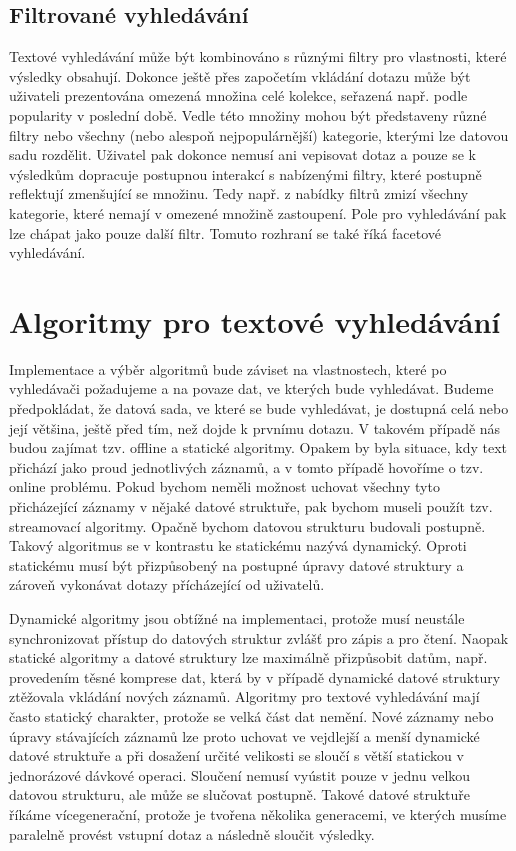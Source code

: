 \documentclass[11pt,letterpaper,oneside,openright]{book}
\begin{document}
\subsection{Filtrované vyhledávání} \label{sec:faceted_search}
Textové vyhledávání může být kombinováno s různými filtry pro vlastnosti, které
výsledky obsahují. Dokonce ještě přes započetím vkládání dotazu může být
uživateli prezentována omezená množina celé kolekce, seřazená např. podle
popularity v poslední době. Vedle této množiny mohou být představeny různé
filtry nebo všechny (nebo alespoň nejpopulárnější) kategorie, kterými lze
datovou sadu rozdělit. Uživatel pak dokonce nemusí ani vepisovat dotaz a pouze
se k výsledkům dopracuje postupnou interakcí s nabízenými filtry, které
postupně reflektují zmenšující se množinu. Tedy např. z nabídky filtrů zmizí
všechny kategorie, které nemají v omezené množině zastoupení. Pole pro
vyhledávání pak lze chápat jako pouze další filtr. Tomuto rozhraní se také říká
facetové vyhledávání.


\section{Algoritmy pro textové vyhledávání}
Implementace a výběr algoritmů bude záviset na vlastnostech, které po
vyhledávači požadujeme a na povaze dat, ve kterých bude vyhledávat. Budeme
předpokládat, že datová sada, ve které se bude vyhledávat, je dostupná celá
nebo její většina, ještě před tím, než dojde k prvnímu dotazu. V takovém
případě nás budou zajímat tzv. offline a statické algoritmy.  Opakem by byla
situace, kdy text přichází jako proud jednotlivých záznamů, a v tomto případě
hovoříme o tzv. online problému. Pokud bychom neměli možnost uchovat všechny
tyto přicházející záznamy v nějaké datové struktuře, pak bychom museli použít
tzv. streamovací algoritmy. Opačně bychom datovou strukturu budovali postupně.
Takový algoritmus se v kontrastu ke statickému nazývá dynamický. Oproti
statickému musí být přizpůsobený na postupné úpravy datové struktury a zároveň
vykonávat dotazy přícházející od uživatelů.

Dynamické algoritmy jsou obtížné na implementaci, protože musí neustále
synchronizovat přístup do datových struktur zvlášť pro zápis a pro čtení.
Naopak statické algoritmy a datové struktury lze maximálně přizpůsobit datům,
např. provedením těsné komprese dat, která by v případě dynamické datové
struktury ztěžovala vkládání nových záznamů. Algoritmy pro textové vyhledávání
mají často statický charakter, protože se velká část dat nemění. Nové záznamy
nebo úpravy stávajících záznamů lze proto uchovat ve vejdlejší a menší
dynamické datové struktuře a při dosažení určité velikosti se sloučí s větší
statickou v jednorázové dávkové operaci. Sloučení nemusí vyústit pouze v jednu
velkou datovou strukturu, ale může se slučovat postupně. Takové datové
struktuře říkáme vícegenerační, protože je tvořena několika generacemi, ve
kterých musíme paralelně provést vstupní dotaz a následně sloučit výsledky.
\end{document}
